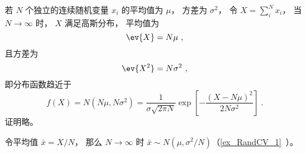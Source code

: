 
\begin{issues}
\issueDraft
\end{issues}


若 $N$ 个独立的连续随机变量 $x_i$ 的平均值为 $\mu$， 方差为 $\sigma^2$， 令 $X = \sum_i^N x_i$， 当 $N \to \infty$ 时， $X$ 满足高斯分布， 平均值为
\begin{equation}
\ev{X} = N\mu~,
\end{equation}
且方差为
\begin{equation}
\ev{X^2} = N\sigma^2~,
\end{equation}
即分布函数趋近于
\begin{equation}
f(X) = N(N\mu, N\sigma^2) = \frac{1}{\sigma\sqrt{2\pi N}} \exp[-\frac{(X-N\mu)^2}{2N\sigma^2}]~.
\end{equation}
证明略。

令平均值 $\bar x = X/N$， 那么 $N\to\infty$ 时 $\bar x\sim N(\mu, \sigma^2/N)$（\autoref{ex_RandCV_1}~）。
